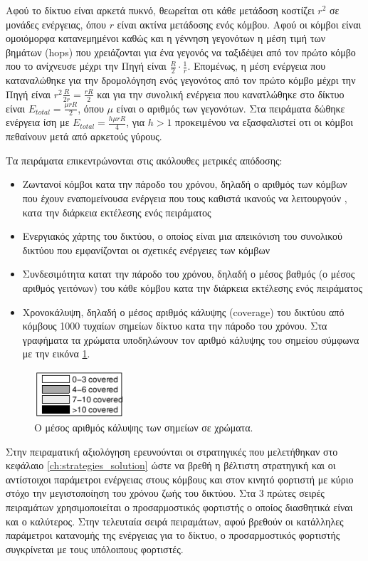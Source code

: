 Αφού το δίκτυο είναι αρκετά πυκνό, θεωρείται οτι κάθε μετάδοση κοστίζει $r^{2}$ σε μονάδες ενέργειας, όπου $r$ είναι ακτίνα μετάδοσης ενός κόμβου. Αφού οι κόμβοι
είναι ομοιόμορφα κατανεμημένοι καθώς και η γέννηση γεγονότων η μέση τιμή των βημάτων (hops) που χρειάζονται για ένα γεγονός να ταξιδέψει από τον πρώτο κόμβο που το
ανίχνευσε μέχρι την Πηγή είναι $\frac{R}{2}\cdot \frac{1}{r}$. Επομένως, η μέση ενέργεια που καταναλώθηκε για την δρομολόγηση ενός γεγονότος από τον πρώτο κόμβο μέχρι
την Πηγή είναι $r^2\frac{R}{2r} = \frac{rR}{2}$ και για την συνολική ενέργεια που κανατλώθηκε στο δίκτυο είναι $E_{total} = \frac{\mu r R}{2}$, όπου $\mu$ είναι ο
αριθμός των γεγονότων. Στα πειράματα δώθηκε ενέργεια ίση με $E_{total} = \frac{h\mu r R}{4}$, για $h > 1$ προκειμένου να εξασφαλιστεί οτι οι κόμβοι πεθαίνουν μετά
από αρκετούς γύρους.

Τα πειράματα επικεντρώνονται στις ακόλουθες μετρικές απόδοσης:
\begin{itemize}
\item Ζωντανοί κόμβοι κατα την πάροδο του χρόνου, δηλαδή ο αριθμός των κόμβων που έχουν εναπομείνουσα ενέργεια που τους καθιστά ικανούς να λειτουργούν , κατα την
 διάρκεια εκτέλεσης ενός πειράματος
\item Ενεργιακός χάρτης του δικτύου, ο οποίος είναι μια απεικόνιση του συνολικού δικτύου που εμφανίζονται οι σχετικές ενέργειες των κόμβων
\item Συνδεσιμότητα κατατ την πάροδο του χρόνου, δηλαδή ο μέσος βαθμός (ο μέσος αριθμός γειτόνων) του κάθε κόμβου κατα την διάρκεια εκτέλεσης ενός πειράματος
\item Χρονοκάλυψη, δηλαδή ο μέσος αριθμός κάλυψης (coverage) του δικτύου από κόμβους 1000 τυχαίων σημείων δίκτυο κατα την πάροδο του χρόνου. Στα γραφήματα τα χρώματα
υποδηλώνουν τον αριθμό κάλυψης του σημείου σύμφωνα με την εικόνα \ref{fig:coverage_sample}.
\end{itemize}

\begin{figure}[h]
  \centering
  \includegraphics[width=0.3\textwidth]{images/network_coverage.eps}
  \caption{Ο μέσος αριθμός κάλυψης των σημείων σε χρώματα.}
  \label{fig:coverage_sample}
\end{figure}

Στην πειραματική αξιολόγηση ερευνούνται οι στρατηγικές που μελετήθηκαν στο κεφάλαιο \ref{ch:strategies_solution} ώστε να βρεθή η βέλτιστη στρατηγική και οι
αντίστοιχοι παράμετροι ενέργειας στους κόμβους και στον κινητό φορτιστή με κύριο στόχο την μεγιστοποίηση του χρόνου ζωής του δικτύου. Στα 3 πρώτες σειρές πειραμάτων
χρησιμοποιείται ο προσαρμοστικός φορτιστής ο οποίος διασθητικά είναι και ο καλύτερος. Στην τελευταία σειρά πειραμάτων, αφού βρεθούν οι κατάλληλες παράμετροι
κατανομής της ενέργειας για το δίκτυο, ο προσαρμοστικός φορτιστής συγκρίνεται με τους υπόλοιπους φορτιστές.


